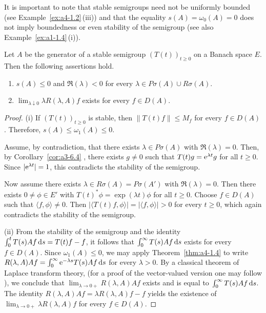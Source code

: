 It is important to note  that stable semigroups need not be uniformly bounded (see Example~\ref{ex:a4-1.2}\,(iii)) and that the equality $ s(A) = \omega_{0}(A) = 0 $ does not imply boundedness or even stability of the semigroup (see also Example~\ref{ex:a1-1.4}\,(i)).
\begin{theorem} \label{thm:a4-1.13} 
Let $ A $ be the generator of a stable semigroup $ (T(t))_{t \geq 0} $ on a Banach space $ E $. Then the following assertions hold.
\begin{enumerate}[\upshape (i)]
    \item 
    $ s(A) \leq 0 $ and $ \Re(\lambda) < 0 $ for every $ \lambda \in P\sigma (A) \cup R\sigma(A) $.
    
    \item 
    $ \lim_{\lambda \downarrow 0} \lambda R(\lambda, A) f $ exists for every $ f \in D(A) $.
\end{enumerate}
\end{theorem}
\begin{proof} (i) If\/ $ (T(t))_{t \geq 0} $ is stable, then $ \|T(t) f\| \leq M_f $ for every $ f \in D(A) $. Therefore, $ s(A) \leq \omega_1(A) \leq 0 $. 

Assume, by contradiction, that there exists $ \lambda \in P\sigma(A) $ with $ \Re(\lambda) = 0 $. 
Then, by Corollary~\ref{cor:a3-6.4} , there exists $ g \neq 0 $ such that $ T(t) g = \mathrm{e}^{\lambda t} g $ for all $ t \geq 0 $. Since $ |\mathrm{e}^{\lambda t}| = 1 $, this contradicts the stability of the semigroup. 

Now assume there exists $ \lambda \in R\sigma(A) = P\sigma(A') $ with $ \Re(\lambda) = 0 $. 
Then there exists $ 0 \neq \phi \in E' $ with $ T(t)^* \phi = \exp(\lambda t) \phi $ for all $ t \geq 0 $. Choose $ f \in D(A) $ such that $ \langle f, \phi \rangle \neq 0 $. 
Then $ |\langle T(t) f, \phi \rangle| = | \langle f, \phi \rangle| > 0 $ for every $ t \geq 0 $, which again contradicts the stability of the semigroup.

(ii) From the stability of the semigroup and the identity   $\int_{0}^{t} T(s) A f  \mathop{}\!\mathrm{d}{s} = T(t) f - f$, it follows that  
$\int_{0}^{\infty} T(s) A f  \mathop{}\!\mathrm{d}{s}$ exists for every $ f \in D(A) $.  
Since $ \omega_1(A) \leq 0 $, we may apply Theorem~\ref{thm:a4-1.4} to write  $ R(\lambda, A) A f = \int_{0}^{\infty} \mathrm{e}^{-\lambda s} T(s) A f  \mathop{}\!\mathrm{d}{s} $ for every $ \lambda > 0 $. 
By a classical theorem of Laplace transform theory, (for a proof of the vector-valued version one may follow \textcite[p.196]{widder:1971}), we conclude that $\lim_{\lambda \to 0+} R(\lambda,A)Af$ exists
and is equal to $\int_{0}^{\infty} T(s)Af  \mathop{}\!\mathrm{d}{s}$. 
The identity $R(\lambda,A)Af = \lambda R(\lambda,A)f - f$
yields the existence of\/ $\lim_{\lambda \to 0+} \lambda R(\lambda,A)f$ for every $f \in D(A)$.
\end{proof}

